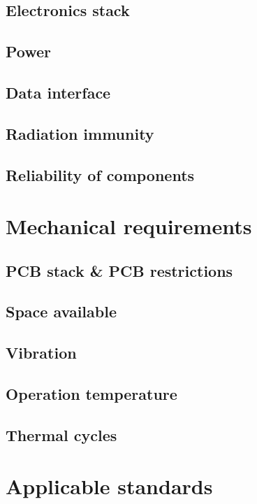 \subsection{Electronics stack}
\subsection{Power}
\subsection{Data interface}
\subsection{Radiation immunity}
\subsection{Reliability of components}

\section{Mechanical requirements}
\subsection{PCB stack \& PCB restrictions}
\subsection{Space available}
\subsection{Vibration}
\subsection{Operation temperature}
\subsection{Thermal cycles}

\section{Applicable standards}